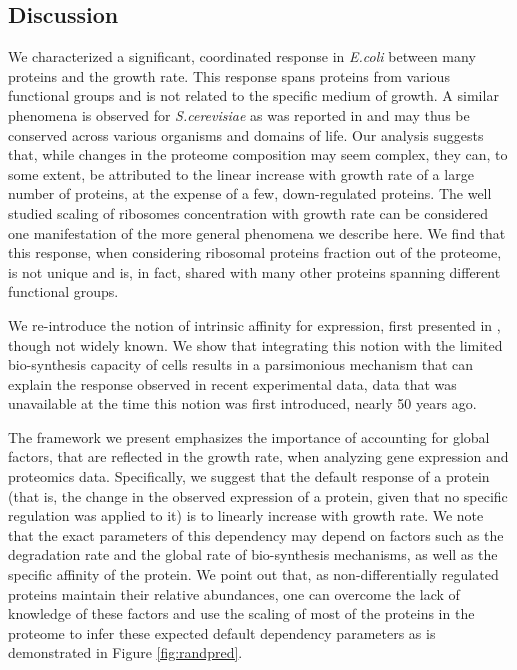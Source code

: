 \documentclass[notitlepage]{article}
\begin{document}
\subsection{Discussion}
We characterized a significant, coordinated response in \emph{E.coli} between many proteins and the growth rate.
This response spans proteins from various functional groups and is not related to the specific medium of growth.
A similar phenomena is observed for \emph{S.cerevisiae} as was reported in \cite{Keren2013a} and may thus be conserved across various organisms and domains of life.
Our analysis suggests that, while changes in the proteome composition may seem complex, they can, to some extent, be attributed to the linear increase with growth rate of a large number of proteins, at the expense of a few, down-regulated proteins.
The well studied scaling of ribosomes concentration with growth rate can be considered one manifestation of the more general phenomena we describe here.
We find that this response, when considering ribosomal proteins fraction out of the proteome, is not unique and is, in fact, shared with many other proteins spanning different functional groups.

We re-introduce the notion of intrinsic affinity for expression, first presented in \cite{Maaloe1969}, though not widely known.
We show that integrating this notion with the limited bio-synthesis capacity of cells results in a parsimonious mechanism that can explain the response observed in recent experimental data, data that was unavailable at the time this notion was first introduced, nearly 50 years ago.

The framework we present emphasizes the importance of accounting for global factors, that are reflected in the growth rate, when analyzing gene expression and proteomics data.
Specifically, we suggest that the default response of a protein (that is, the change in the observed expression of a protein, given that no specific regulation was applied to it) is to linearly increase with growth rate.
We note that the exact parameters of this dependency may depend on factors such as the degradation rate and the global rate of bio-synthesis mechanisms, as well as the specific affinity of the protein.
We point out that, as non-differentially regulated proteins maintain their relative abundances, one can overcome the lack of knowledge of these factors and use the scaling of most of the proteins in the proteome to infer these expected default dependency parameters as is demonstrated in Figure \ref{fig:randpred}.
\end{document}
